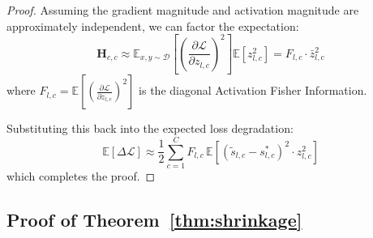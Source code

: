 \documentclass{article}
\theoremstyle{plain}
\theoremstyle{definition}
\theoremstyle{remark}
\begin{document}
\begin{proof}
Assuming the gradient magnitude and activation magnitude are approximately independent, we can factor the expectation:
\begin{equation}
    \mathbf{H}_{c,c} \approx \mathbb{E}_{x,y \sim \mathcal{D}} \left[ \left( \frac{\partial \mathcal{L}}{\partial z_{l,c}} \right)^2 \right] \mathbb{E}[z_{l,c}^2] = F_{l,c} \cdot \bar{z}_{l,c}^2
\end{equation}
where $F_{l,c} = \mathbb{E}\left[ \left( \frac{\partial \mathcal{L}}{\partial z_{l,c}} \right)^2 \right]$ is the diagonal Activation Fisher Information.

Substituting this back into the expected loss degradation:
\begin{equation}
    \mathbb{E}[\Delta \mathcal{L}] \approx \frac{1}{2} \sum_{c=1}^C F_{l,c} \, \mathbb{E}[(\tilde{s}_{l,c} - s^*_{l,c})^2 \cdot z_{l,c}^2 ]
\end{equation}
which completes the proof.
\end{proof}

\subsection{Proof of Theorem~\ref{thm:shrinkage}}
\end{document}
